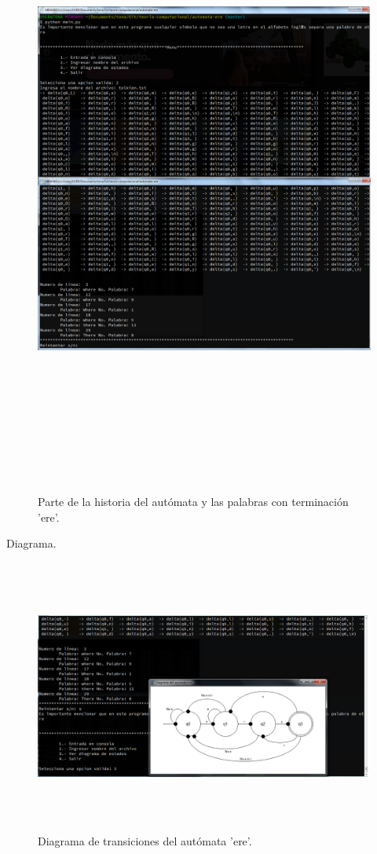 	\begin{figure}[H]
		\begin{center}
			\includegraphics[width=\linewidth, height=21cm]{img/ere-automatico.png}
			\caption{Parte de la historia del autómata y las palabras con terminación 'ere'.}
			\label{fig:ere2}
		\end{center}
	\end{figure}
	{\large Diagrama.}
	\begin{figure}[H]
		\begin{center}
			\includegraphics[width=\linewidth, height=9cm]{img/diagrama-ere.png}
			\caption{Diagrama de transiciones del autómata 'ere'.}
			\label{fig:ere3}
		\end{center}
	\end{figure}